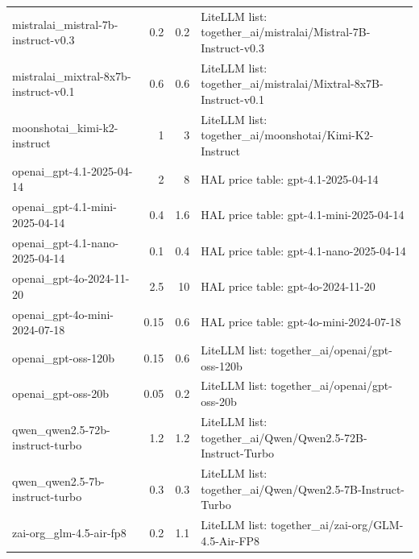 \begin{longtable}{lrrp{7cm}}
mistralai\_mistral-7b-instruct-v0.3 & 0.2 & 0.2 & LiteLLM list: together\_ai/mistralai/Mistral-7B-Instruct-v0.3 \\
mistralai\_mixtral-8x7b-instruct-v0.1 & 0.6 & 0.6 & LiteLLM list: together\_ai/mistralai/Mixtral-8x7B-Instruct-v0.1 \\
moonshotai\_kimi-k2-instruct & 1 & 3 & LiteLLM list: together\_ai/moonshotai/Kimi-K2-Instruct \\
openai\_gpt-4.1-2025-04-14 & 2 & 8 & HAL price table: gpt-4.1-2025-04-14 \\
openai\_gpt-4.1-mini-2025-04-14 & 0.4 & 1.6 & HAL price table: gpt-4.1-mini-2025-04-14 \\
openai\_gpt-4.1-nano-2025-04-14 & 0.1 & 0.4 & HAL price table: gpt-4.1-nano-2025-04-14 \\
openai\_gpt-4o-2024-11-20 & 2.5 & 10 & HAL price table: gpt-4o-2024-11-20 \\
openai\_gpt-4o-mini-2024-07-18 & 0.15 & 0.6 & HAL price table: gpt-4o-mini-2024-07-18 \\
openai\_gpt-oss-120b & 0.15 & 0.6 & LiteLLM list: together\_ai/openai/gpt-oss-120b \\
openai\_gpt-oss-20b & 0.05 & 0.2 & LiteLLM list: together\_ai/openai/gpt-oss-20b \\
qwen\_qwen2.5-72b-instruct-turbo & 1.2 & 1.2 & LiteLLM list: together\_ai/Qwen/Qwen2.5-72B-Instruct-Turbo \\
qwen\_qwen2.5-7b-instruct-turbo & 0.3 & 0.3 & LiteLLM list: together\_ai/Qwen/Qwen2.5-7B-Instruct-Turbo \\
zai-org\_glm-4.5-air-fp8 & 0.2 & 1.1 & LiteLLM list: together\_ai/zai-org/GLM-4.5-Air-FP8 \\
\end{longtable}
